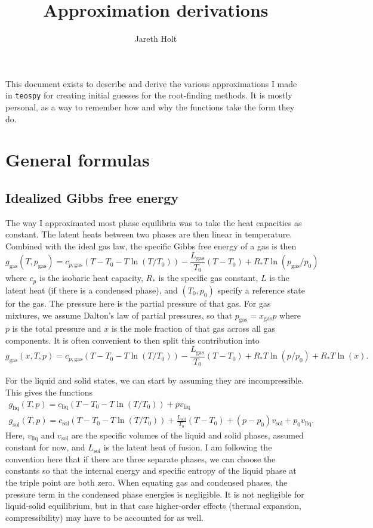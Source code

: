 \documentclass{article}
\title{Approximation derivations}
\author{Jareth Holt}
\newcommand{\gas}{\text{gas}}
\newcommand{\liq}{\text{liq}}
\newcommand{\sol}{\text{sol}}
\begin{document}
\maketitle

This document exists to describe and derive the various approximations I made in \texttt{teospy} for creating initial guesses for the root-finding methods. It is mostly personal, as a way to remember how and why the functions take the form they do.


\section{General formulas}


\subsection{Idealized Gibbs free energy}

The way I approximated most phase equilibria was to take the heat capacities as constant. The latent heats between two phases are then linear in temperature. Combined with the ideal gas law, the specific Gibbs free energy of a gas is then
\begin{equation*}
    g_{\gas}(T,p_{\gas}) = c_{p,\gas} (T - T_0 - T \ln(T/T_0)) - \frac{L_{\gas}}{T_0} (T - T_0) + R_* T \ln(p_{\gas}/p_0)
\end{equation*}
where $c_p$ is the isobaric heat capacity, $R_*$ is the specific gas constant, $L$ is the latent heat (if there is a condensed phase), and $(T_0,p_0)$ specify a reference state for the gas. The pressure here is the partial pressure of that gas. For gas mixtures, we assume Dalton's law of partial pressures, so that $p_{\gas} = x_{\gas} p$ where $p$ is the total pressure and $x$ is the mole fraction of that gas across all gas components. It is often convenient to then split this contribution into
\begin{equation*}
    g_{\gas}(x,T,p) = c_{p,\gas} (T - T_0 - T \ln(T/T_0)) - \frac{L_{\gas}}{T_0} (T - T_0) + R_* T \ln(p/p_0) + R_* T \ln(x).
\end{equation*}

For the liquid and solid states, we can start by assuming they are incompressible. This gives the functions
\begin{gather*}
    g_{\liq}(T,p) = c_{\liq} (T - T_0 - T \ln(T/T_0)) + p v_{\liq} \\
    g_{\sol}(T,p) = c_{\sol} (T - T_0 - T \ln(T/T_0)) + \frac{L_{\sol}}{T_0} (T - T_0) + (p - p_0) v_{\sol} + p_0 v_{\liq}.
\end{gather*}
Here, $v_{\liq}$ and $v_{\sol}$ are the specific volumes of the liquid and solid phases, assumed constant for now, and $L_{\sol}$ is the latent heat of fusion. I am following the convention here that if there are three separate phases, we can choose the constants so that the internal energy and specific entropy of the liquid phase at the triple point are both zero. When equating gas and condensed phases, the pressure term in the condensed phase energies is negligible. It is not negligible for liquid-solid equilibrium, but in that case higher-order effects (thermal expansion, compressibility) may have to be accounted for as well.
\end{document}
